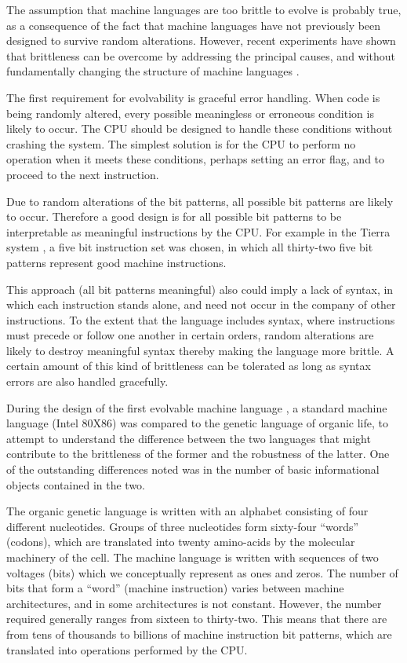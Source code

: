 The assumption that machine languages are too brittle to evolve is
probably true, as a consequence of the fact that machine languages
have not previously been designed to survive random alterations.
However, recent experiments have shown that brittleness can be
overcome by addressing the principal causes, and without fundamentally
changing the structure of machine languages \cite{Ray91a,RaySu}.

The first requirement for evolvability is graceful error handling.
When code is being randomly altered, every possible meaningless or
erroneous condition is likely to occur.  The CPU should be designed
to handle these conditions without crashing the system.  The simplest
solution is for the CPU to perform no operation when it meets
these conditions, perhaps setting an error flag, and to proceed to
the next instruction.

Due to random alterations of the bit patterns, all possible bit patterns
are likely to occur.  Therefore a good design is for all possible bit
patterns to be interpretable as meaningful instructions by the CPU.
For example in the Tierra system
\cite{Ray91a,Ray91b,Ray91c,Ray91d,RayIp,RaySu}, a five bit instruction
set was chosen, in which all thirty-two five bit patterns represent
good machine instructions.

This approach (all bit patterns meaningful) also could imply a lack of syntax,
in which each instruction stands alone, and need not occur in the company
of other instructions.  To the extent that the language includes syntax,
where instructions must precede or follow one another in certain orders,
random alterations are likely to destroy meaningful syntax thereby making
the language more brittle.  A certain amount of this kind of brittleness
can be tolerated as long as syntax errors are also handled gracefully.

During the design of the first evolvable machine language \cite{Ray91a},
a standard machine language (Intel 80X86) was compared to the genetic
language of organic life, to attempt to understand the difference between
the two languages that might contribute to the brittleness of the former
and the robustness of the latter.  One of the outstanding differences
noted was in the number of basic informational objects contained in the
two.

The organic genetic language is written with an alphabet consisting
of four different nucleotides.  Groups of three nucleotides form
sixty-four ``words'' (codons), which are translated into twenty
amino-acids by the molecular machinery of the cell.  The machine
language is written with sequences of two voltages (bits) which
we conceptually represent as ones and zeros.  The number of bits that
form a ``word'' (machine instruction) varies between machine
architectures, and in some architectures is not constant.  However,
the number required generally ranges from sixteen to thirty-two.  This
means that there are from tens of thousands to billions of machine
instruction bit patterns, which are translated into operations
performed by the CPU.

